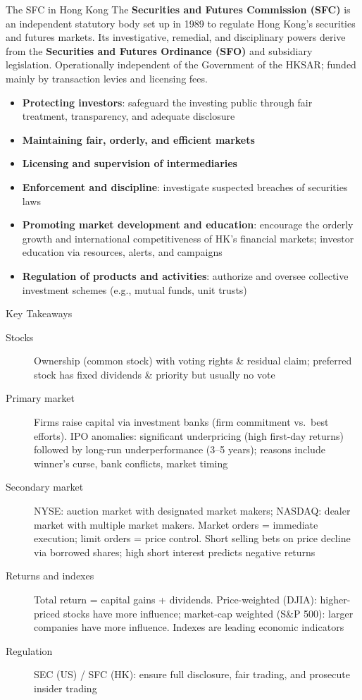 \documentclass[aspectratio=169]{beamer}
\begin{document}
\begin{frame}{The SFC in Hong Kong}
The \textbf{Securities and Futures Commission (SFC)} is an independent statutory body set up in 1989 to regulate Hong Kong's securities and futures markets. Its investigative, remedial, and disciplinary powers derive from the \textbf{Securities and Futures Ordinance (SFO)} and subsidiary legislation. Operationally independent of the Government of the HKSAR; funded mainly by transaction levies and licensing fees.
\vspace{0.3em}
\begin{itemize}
  \item \textbf{Protecting investors}: safeguard the investing public through fair treatment, transparency, and adequate disclosure
  \item \textbf{Maintaining fair, orderly, and efficient markets}
  \item \textbf{Licensing and supervision of intermediaries}
  \item \textbf{Enforcement and discipline}: investigate suspected breaches of securities laws
  \item \textbf{Promoting market development and education}: encourage the orderly growth and international competitiveness of HK's financial markets; investor education via resources, alerts, and campaigns
  \item \textbf{Regulation of products and activities}: authorize and oversee collective investment schemes (e.g., mutual funds, unit trusts)
\end{itemize}
\end{frame}

\begin{frame}{Key Takeaways}
\begin{description}
  \item[Stocks] Ownership (common stock) with voting rights \& residual claim; preferred stock has fixed dividends \& priority but usually no vote
  \item[Primary market] Firms raise capital via investment banks (firm commitment vs.\ best efforts). IPO anomalies: significant underpricing (high first-day returns) followed by long-run underperformance (3--5 years); reasons include winner's curse, bank conflicts, market timing
  \item[Secondary market] NYSE: auction market with designated market makers; NASDAQ: dealer market with multiple market makers. Market orders = immediate execution; limit orders = price control. Short selling bets on price decline via borrowed shares; high short interest predicts negative returns
  \item[Returns and indexes] Total return = capital gains + dividends. Price-weighted (DJIA): higher-priced stocks have more influence; market-cap weighted (S\&P 500): larger companies have more influence. Indexes are leading economic indicators
  \item[Regulation] SEC (US) / SFC (HK): ensure full disclosure, fair trading, and prosecute insider trading
\end{description}
\end{frame}
\end{document}
